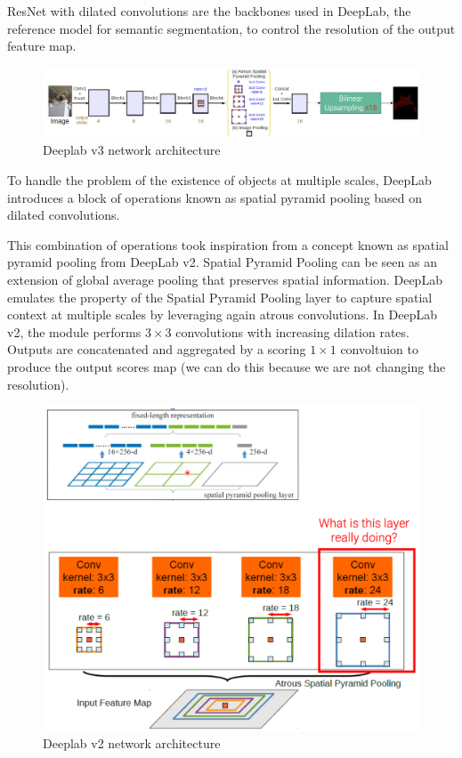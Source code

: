 ResNet with dilated convolutions are the backbones used in DeepLab, the reference model for semantic segmentation, to control the resolution of the output feature map.

\begin{figure}[htbp]
  \centering
  \includegraphics[width=0.7\linewidth]{./img/deeplab.jpg}
  \caption{Deeplab v3 network architecture}
\end{figure}

To handle the problem of the existence of objects at multiple scales, DeepLab introduces a block of operations known as spatial pyramid pooling based on dilated convolutions.

This combination of operations took inspiration from a concept known as spatial pyramid pooling from DeepLab v2.
Spatial Pyramid Pooling can be seen as an extension of global average pooling that preserves spatial information.
DeepLab emulates the property of the Spatial Pyramid Pooling layer to capture spatial context at multiple scales by leveraging again atrous convolutions.
In DeepLab v2, the module performs $3 \times 3$ convolutions with increasing dilation rates.
Outputs are concatenated and aggregated by a scoring $1\times 1$ convoltuion to produce the output scores map (we can do this because we are not changing the resolution).

\begin{figure}[htbp]
  \centering
  \includegraphics[width=0.7\linewidth]{./img/deeplab_v2.png}
  \caption{Deeplab v2 network architecture}
\end{figure}

